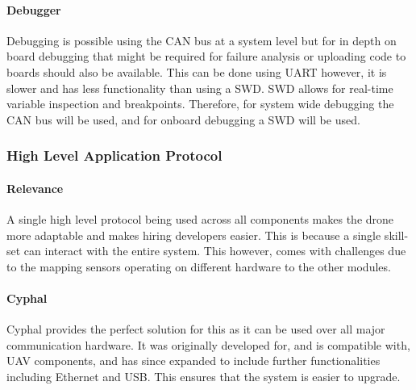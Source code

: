 \paragraph{Debugger}
Debugging is possible using the \gls{CAN} bus at a system level but for in depth on board debugging that might be required for failure analysis or uploading code to boards should also be available. This can be done using \gls{UART} however, it is slower and has less functionality than using a \gls{SWD}. \gls{SWD} allows for real-time variable inspection and breakpoints. Therefore, for system wide debugging the \gls{CAN} bus will be used, and for onboard debugging a \gls{SWD} will be used.




\subsubsection{High Level Application Protocol}
\paragraph{Relevance}
A single high level protocol being used across all components makes the drone more adaptable and makes hiring developers easier. This is because a single skill-set can interact with the entire system. This however, comes with challenges due to the mapping sensors operating on different hardware to the other modules.

\paragraph{Cyphal}
Cyphal provides the perfect solution for this as it can be used over all major communication hardware. It was originally developed for, and is compatible with, \gls{UAV} components, and has since expanded to include further functionalities including Ethernet and \gls{USB}. This ensures that the system is easier to upgrade.
